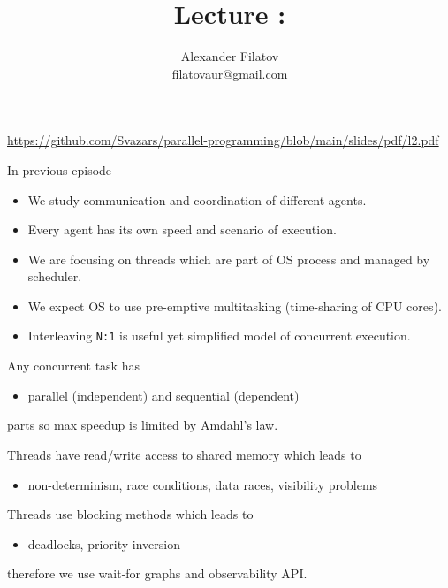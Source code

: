 


\title[]{Lecture \basicNum: \basicTopic}
\subtitle[]{\basicKey}
\author[]{Alexander Filatov\\ filatovaur@gmail.com}

\date{}

\newcommand{\taskAsyncException}{2.1}
\newcommand{\taskProofMutex}{2.2.a}
\newcommand{\taskProofDeadlockFreedom}{2.2.b}
\newcommand{\taskReentrant}{2.3}
\newcommand{\taskCounters}{2.4}
\newcommand{\taskEmpireLock}{2.5}
\newcommand{\taskCodeDining}{2.6}



\begin{frame}
  \titlepage
    \url{https://github.com/Svazars/parallel-programming/blob/main/slides/pdf/l2.pdf}
\end{frame}

\begin{frame}{In previous episode}

\begin{itemize}
 \item We study communication and coordination of different agents.
 \item Every agent has its own speed and scenario of execution.
 \item We are focusing on threads which are part of OS process and managed by scheduler.
 \item We expect OS to use pre-emptive multitasking (time-sharing of CPU cores).
 \item Interleaving \texttt{N:1} is useful yet simplified model of concurrent execution.
\end{itemize}

Any concurrent task has
\begin{itemize}
    \item parallel (independent) and sequential (dependent)
\end{itemize}
parts so max speedup is limited by Amdahl's law.

Threads have read/write access to shared memory which leads to
\begin{itemize}
    \item non-determinism, race conditions, data races, visibility problems
\end{itemize}

Threads use blocking methods which leads to
\begin{itemize}
    \item deadlocks, priority inversion
\end{itemize}
therefore we use wait-for graphs and observability API.

\end{frame}

